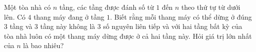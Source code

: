 \begin{ex}
Một tòa nhà có $n$ tầng, các tầng được đánh số từ $1$ đến $n$ theo thứ tự từ dưới lên. Có $4$ thang máy đang ở tầng $1$. Biết rằng mỗi thang máy có thể dừng ở đúng $3$ tầng và $3$ tầng này không là $3$ số nguyên liên tiếp và với hai tầng bất kỳ của tòa nhà luôn có một thang máy dừng được ở cả hai tầng này. Hỏi giá trị lớn nhất của $n$ là bao nhiêu?
\end{ex}
